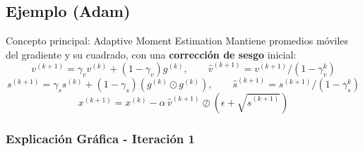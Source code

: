 \subsection{Ejemplo (Adam)}


\providecommand{\reflibro}[1]{\par\vspace{0.5em}{\scriptsize\textcolor{GrisTexto!70}{\textit{Ref. libro:} #1}}}

\newcommand{\adamValle}{%
    \foreach \r/\cl in {0.6/niv1, 1.2/niv2, 1.9/niv3, 2.6/niv4, 3.4/niv5, 4.3/niv6, 5.3/niv7}
        \draw[\cl, rotate around={30:(0,0)}] (0,0) ellipse ({\r} and {\r/3.1623});%
}

\newcommand{\momElipses}{%
    \foreach \r/\cl in {0.8/niv1, 1.6/niv2, 2.5/niv3, 3.6/niv4, 5.1/niv5, 6.8/niv6}
        \draw[\cl] (0,0) ellipse ({\r} and {\r/3.1623});%
}


\begin{cajaconcepto}{Concepto principal: Adaptive Moment Estimation}
    Mantiene promedios móviles del gradiente y su cuadrado, con una \textbf{corrección de sesgo} inicial:
    \[ v^{(k+1)}=\gamma_v v^{(k)}+(1-\gamma_v)g^{(k)}, \qquad \hat{v}^{(k+1)}=v^{(k+1)}/(1-\gamma_v^k) \]
    \[ s^{(k+1)}=\gamma_s s^{(k)}+(1-\gamma_s)(g^{(k)}\odot g^{(k)}), \qquad \hat{s}^{(k+1)}=s^{(k+1)}/(1-\gamma_s^k) \]
    \[ x^{(k+1)}=x^{(k)}-\alpha\,\hat{v}^{(k+1)}\oslash(\epsilon+\sqrt{\hat{s}^{(k+1)}}) \]
\end{cajaconcepto}

\subsubsection*{Explicación Gráfica - Iteración 1}

